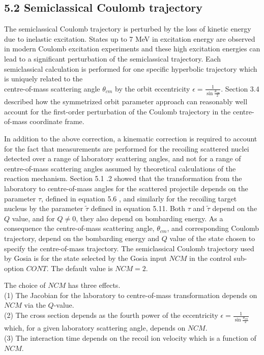 \documentclass[10pt]{article}
\begin{document}
\subsection*{5.2 Semiclassical Coulomb trajectory}
The semiclassical Coulomb trajectory is perturbed by the loss of kinetic energy due to inelastic excitation. States up to 7 MeV in excitation energy are observed in modern Coulomb excitation experiments and these high excitation energies can lead to a significant perturbation of the semiclassical trajectory. Each semiclassical calculation is performed for one specific hyperbolic trajectory which is uniquely related to the\\
centre-of-mass scattering angle $\theta_{c m}$ by the orbit eccentricity $\epsilon=\frac{1}{\sin \frac{\theta_{c m}}{2}}$. Section 3.4 described how the symmetrized orbit parameter approach can reasonably well account for the first-order perturbation of the Coulomb trajectory in the centre-of-mass coordinate frame.

In addition to the above correction, a kinematic correction is required to account for the fact that measurements are performed for the recoiling scattered nuclei detected over a range of laboratory scattering angles, and not for a range of centre-of-mass scattering angles assumed by theoretical calculations of the reaction mechanism. Section 5.1 .2 showed that the transformation from the laboratory to centre-of-mass angles for the scattered projectile depends on the parameter $\tau$, defined in equation 5.6 , and similarly for the recoiling target nucleus by the parameter $\tilde{\tau}$ defined in equation 5.11. Both $\tau$ and $\tilde{\tau}$ depend on the $Q$ value, and for $Q \neq 0$, they also depend on bombarding energy. As a consequence the centre-of-mass scattering angle, $\theta_{c m}$, and corresponding Coulomb trajectory, depend on the bombarding energy and $Q$ value of the state chosen to specify the centre-of-mass trajectory. The semiclassical Coulomb trajectory used by Gosia is for the state selected by the Gosia input $N C M$ in the control sub-option $C O N T$. The default value is $N C M=2$.

The choice of $N C M$ has three effects.\\
(1) The Jacobian for the laboratory to centre-of-mass transformation depends on $N C M$ via the $Q$-value.\\
(2) The cross section depends as the fourth power of the eccentricity $\epsilon=\frac{1}{\sin \frac{\theta_{c m}}{2}}$ which, for a given laboratory scattering angle, depends on $N C M$.\\
(3) The interaction time depends on the recoil ion velocity which is a function of $N C M$.
\end{document}
